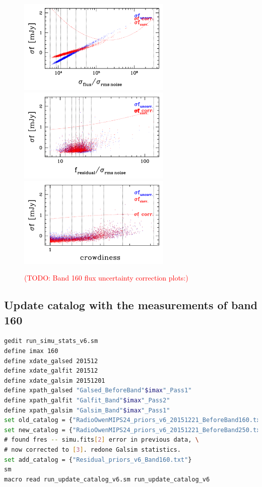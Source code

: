 \documentclass[11pt,a4paper]{article}
\begin{document}
\begin{figure}[H]
	\caption{
		\textcolor{red}{(TODO: Band 160 flux uncertainty correction plots:)}
	}
	\includegraphics[width=0.65\textwidth]{galsim_160_dfcorr_1}
	\includegraphics[width=0.65\textwidth]{galsim_160_dfcorr_2}
	\includegraphics[width=0.65\textwidth]{galsim_160_dfcorr_3}
\end{figure}


\subsection{Update catalog with the measurements of band 160}

\begin{lstlisting}[language=bash]
gedit run_simu_stats_v6.sm
define imax 160
define xdate_galsed 201512
define xdate_galfit 201512
define xdate_galsim 20151201
define xpath_galsed "Galsed_BeforeBand"$imax"_Pass1"
define xpath_galfit "Galfit_Band"$imax"_Pass2"
define xpath_galsim "Galsim_Band"$imax"_Pass1"
set old_catalog = {"RadioOwenMIPS24_priors_v6_20151221_BeforeBand160.txt"}
set new_catalog = {"RadioOwenMIPS24_priors_v6_20151221_BeforeBand250.txt"} \
# found fres -- simu.fits[2] error in previous data, \
# now corrected to [3]. redone Galsim statistics. 
set add_catalog = {"Residual_priors_v6_Band160.txt"}
sm
macro read run_update_catalog_v6.sm run_update_catalog_v6
\end{lstlisting}
\end{document}

